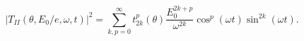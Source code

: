 \begin{equation}
|T_{II}(\theta ,E_{0}/e,\omega ,t)|^{2}=\sum_{k,p=0}^{\infty
}t_{2k}^{p}(\theta )\frac{E_{0}^{2k+p}}{\omega ^{2k}}\cos ^{p}(\omega t)\sin
^{2k}(\omega t).  \label{exp2}
\end{equation}


